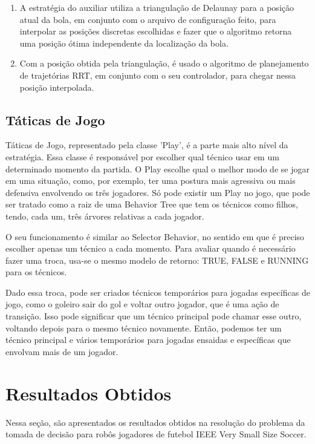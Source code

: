 \documentclass[a4paper,12pt]{article}
\begin{document}
\begin{enumerate}
\item A estratégia do auxiliar utiliza a triangulação de Delaunay para a posição atual da bola, em conjunto com o arquivo de configuração feito, para interpolar as posições discretas escolhidas e fazer que o algoritmo retorna uma posição ótima independente da localização da bola.

\item Com a posição obtida pela triangulação, é usado o algoritmo de planejamento de trajetórias RRT, em conjunto com o seu controlador, para chegar nessa posição interpolada.

\end{enumerate}

\subsection{Táticas de Jogo}

Táticas de Jogo, representado pela classe 'Play', é a parte mais alto nível da estratégia. Essa classe é responsável por escolher qual técnico usar em um determinado momento da partida. O Play escolhe qual o melhor modo de se jogar em uma situação, como, por exemplo, ter uma postura mais agressiva ou mais defensiva envolvendo os três jogadores. Só pode existir um Play no jogo, que pode ser tratado como a raiz de uma Behavior Tree que tem os técnicos como filhos, tendo, cada um, três árvores relativas a cada jogador.

O seu funcionamento é similar ao Selector Behavior, no sentido em que é preciso escolher apenas um técnico a cada momento. Para avaliar quando é necessário fazer uma troca, usa-se o mesmo modelo de retorno: TRUE, FALSE e RUNNING para os técnicos. 

Dado essa troca, pode ser criados técnicos temporários para jogadas específicas de jogo, como o goleiro sair do gol e voltar outro jogador, que é uma ação de transição. Isso pode significar que um técnico principal pode chamar esse outro, voltando depois para o mesmo técnico novamente. Então, podemos ter um técnico principal e vários temporários para jogadas ensaidas e específicas que envolvam mais de um jogador.


\section{Resultados Obtidos}
	\label{secao: resultados_obtidos}
    
Nessa seção, são apresentados os resultados obtidos na resolução do problema da tomada de decisão para robôs jogadores de futebol IEEE Very Small Size Soccer.
\end{document}
